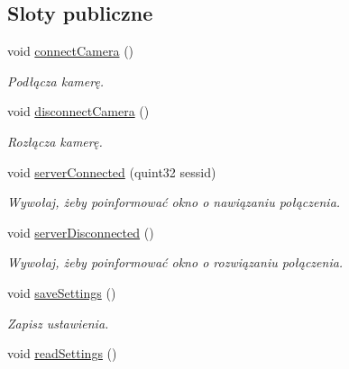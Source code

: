 \subsection*{Sloty publiczne}
\begin{DoxyCompactItemize}
\item 
\hypertarget{class_config_dialog_a21d23a581bbbf582c4a25d7d7204e764}{
void \hyperlink{class_config_dialog_a21d23a581bbbf582c4a25d7d7204e764}{connectCamera} ()}
\label{class_config_dialog_a21d23a581bbbf582c4a25d7d7204e764}

\begin{DoxyCompactList}\small\item\em Podłącza kamerę. \item\end{DoxyCompactList}\item 
\hypertarget{class_config_dialog_a4e9e42e4decdb4f6895f4b47d51b550e}{
void \hyperlink{class_config_dialog_a4e9e42e4decdb4f6895f4b47d51b550e}{disconnectCamera} ()}
\label{class_config_dialog_a4e9e42e4decdb4f6895f4b47d51b550e}

\begin{DoxyCompactList}\small\item\em Rozłącza kamerę. \item\end{DoxyCompactList}\item 
void \hyperlink{class_config_dialog_a5611fa4c9de2827139161cd75a7f4be6}{serverConnected} (quint32 sessid)
\begin{DoxyCompactList}\small\item\em Wywołaj, żeby poinformować okno o nawiązaniu połączenia. \item\end{DoxyCompactList}\item 
void \hyperlink{class_config_dialog_a7782fa76c40b70438677baff0c2622f2}{serverDisconnected} ()
\begin{DoxyCompactList}\small\item\em Wywołaj, żeby poinformować okno o rozwiązaniu połączenia. \item\end{DoxyCompactList}\item 
void \hyperlink{class_config_dialog_adfe6884aef5e1c04ce574c6c9a1a97d9}{saveSettings} ()
\begin{DoxyCompactList}\small\item\em Zapisz ustawienia. \item\end{DoxyCompactList}\item 
\hypertarget{class_config_dialog_a06d4edc9ec519809ce9104b66b15dadf}{
void \hyperlink{class_config_dialog_a06d4edc9ec519809ce9104b66b15dadf}{readSettings} ()}
\label{class_config_dialog_a06d4edc9ec519809ce9104b66b15dadf}


\end{DoxyCompactItemize}
